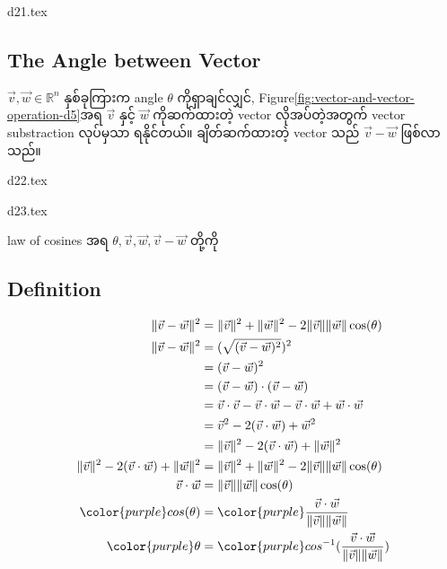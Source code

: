 \begin{center}
    {d21.tex}
\end{center}

\subsection{The Angle between Vector}
$\vec{v},\vec{w}\in\mathbb{R}^n$ နှစ်ခုကြားက angle $\theta$ ကိုရှာချင်လျှင်, Figure\ref{fig:vector-and-vector-operation-d5}အရ $\vec{v}$ နှင့် $\vec{w}$ ကိုဆက်ထားတဲ့ vector လိုအပ်တဲ့အတွက် vector substraction လုပ်မှသာ ရနိုင်တယ်။ ချိတ်ဆက်ထားတဲ့ vector သည် $\vec{v}-\vec{w}$ ဖြစ်လာသည်။

\begin{minipage}{0.45\textwidth}
    \centering
    {d22.tex}
\end{minipage}
\hfill
\begin{minipage}{0.45\textwidth}
    \centering
    {d23.tex}
\end{minipage}

law of cosines အရ $\theta,\vec{v},\vec{w},\vec{v}-\vec{w}$ တို့ကို
\subsection{Definition}
\begin{equation}
    \begin{split}
        \|\vec{v}-\vec{w}\|^2&=\|\vec{v}\|^2+\|\vec{w}\|^2-2\|\vec{v}\|\|\vec{w}\|\cos(\theta) \\
        \|\vec{v}-\vec{w}\|^2&=(\sqrt{(\vec{v}-\vec{w})^2})^2 \\
        &=(\vec{v}-\vec{w})^2 \\
        &=(\vec{v}-\vec{w})\cdot(\vec{v}-\vec{w}) \\
        &=\vec{v}\cdot\vec{v}-\vec{v}\cdot\vec{w}-\vec{v}\cdot\vec{w}+\vec{w}\cdot\vec{w} \\
        &=\vec{v}^2-2(\vec{v}\cdot\vec{w})+\vec{w}^2 \\
        &=\|\vec{v}\|^2-2(\vec{v}\cdot\vec{w})+\|\vec{w}\|^2 \\
        \|\vec{v}\|^2-2(\vec{v}\cdot\vec{w})+\|\vec{w}\|^2&=\|\vec{v}\|^2+\|\vec{w}\|^2-2\|\vec{v}\|\|\vec{w}\|\cos(\theta)  \\
        \vec{v}\cdot\vec{w}&=\|\vec{v}\|\|\vec{w}\|\cos(\theta) \\
        {\color{purple} cos(\theta)}&={\color{purple} \frac{\vec{v}\cdot\vec{w}}{\|\vec{v}\|\|\vec{w}\|}} \\
        {\color{purple} \theta}&={\color{purple} cos^{-1}(\frac{\vec{v}\cdot\vec{w}}{\|\vec{v}\|\|\vec{w}\|})}
    \end{split}
\end{equation}
